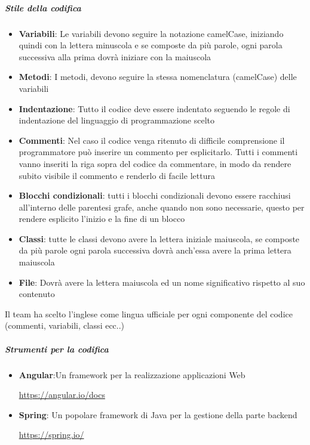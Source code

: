 \documentclass[12pt]{article}
\begin{document}
\subparagraph{Stile della codifica}
\begin{itemize}
    \item \textbf{Variabili}: Le variabili devono seguire la notazione camelCase, iniziando quindi con la lettera minuscola e se composte da più parole, ogni parola successiva alla prima dovrà iniziare con la maiuscola
    \item \textbf{Metodi}: I metodi, devono seguire la stessa nomenclatura (camelCase) delle variabili
    \item \textbf{Indentazione}: Tutto il codice deve essere indentato seguendo le regole di indentazione del linguaggio di programmazione scelto
    \item \textbf{Commenti}: Nel caso il codice venga ritenuto di difficile comprensione il programmatore può inserire un commento per esplicitarlo. Tutti i commenti vanno inseriti la riga sopra del codice da commentare, in modo da rendere subito visibile il commento e renderlo di facile lettura
    \item \textbf{Blocchi condizionali}: tutti i blocchi condizionali devono essere racchiusi all'interno delle parentesi grafe, anche quando non sono necessarie, questo per rendere esplicito l'inizio e la fine di un blocco
    \item \textbf{Classi}: tutte le classi devono avere la lettera iniziale maiuscola, se composte da più parole ogni parola successiva dovrà anch'essa avere la prima lettera maiuscola
    \item \textbf{File}: Dovrà avere la lettera maiuscola ed un nome significativo rispetto al suo contenuto
\end{itemize}

Il team ha scelto l'inglese come lingua ufficiale per ogni componente del codice (commenti, variabili, classi ecc..)

\subparagraph{Strumenti per la codifica}
\begin{itemize}
    \item \textbf{Angular}:Un framework per la realizzazione applicazioni Web\\
          \begin{center}
              \url{https://angular.io/docs}
          \end{center}
    \item \textbf{Spring}: Un popolare framework di Java per la gestione della parte backend
          \begin{center}
              \url{https://spring.io/}
          \end{center}
\end{itemize}
\end{document}
